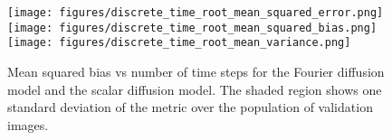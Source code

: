 \documentclass[12pt,]{article}
\begin{document}





\begin{figure}
    \centering
\texttt{[image: figures/discrete\_time\_root\_mean\_squared\_error.png]}
\texttt{[image: figures/discrete\_time\_root\_mean\_squared\_bias.png]}
\texttt{[image: figures/discrete\_time\_root\_mean\_variance.png]}
    \caption{Mean squared bias vs number of time steps for the Fourier diffusion model and the scalar diffusion model. The shaded region shows one standard deviation of the metric over the population of validation images. }
    \label{fig:image_quality_metrics}
\end{figure}







\end{document}
